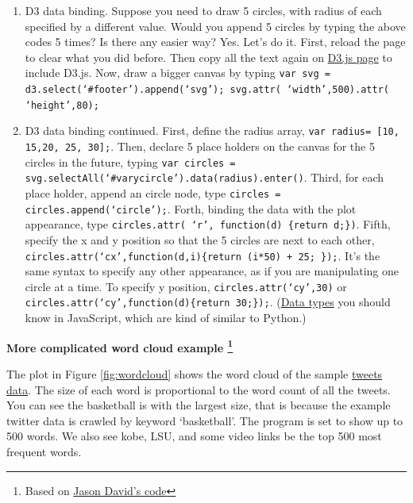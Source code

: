 \documentclass[a4paper, 11pt]{article}
\begin{document}
\begin{enumerate}
\item D3 data binding. Suppose you need to draw 5 circles, with radius of each specified by a different value. Would you append 5 circles by typing the above codes 5 times? Is there any easier way? Yes. Let's do it. First, reload the page to clear what you did before. Then copy all the text again on \href{https://raw.githubusercontent.com/mbostock/d3/master/d3.min.js}{D3.js page} to include D3.js. Now, draw a bigger canvas by typing \texttt{var svg = d3.select(`\#{footer}').append(`svg'); svg.attr( `width',500).attr( `height',80);} 
\item D3 data binding continued. First, define the radius array, \texttt{var radius= [10, 15,20, 25, 30];}. Then, declare 5 place holders on the canvas for the 5 circles in the future, typing \texttt{var circles = svg.selectAll(`\#{varycircle}').data(radius).enter()}. Third, for each place holder, append an circle node, type \texttt{circles = circles.append(`circle');}. Forth, binding the data with the plot appearance, type \texttt{circles.attr( `r', function(d) \{return d;\})}. Fifth, specify the x and y position so that the 5 circles are next to each other, \texttt{circles.attr(`cx',function(d,i)\{return (i*50) + 25; \});}. It's the same syntax to specify any other appearance, as if you are manipulating one circle at a time. To specify y position, \texttt{circles.attr(`cy',30)} or \texttt{circles.attr(`cy',function(d)\{return 30;\});}. (\href{http://alignedleft.com/tutorials/d3/data-types}{Data types} you should know in JavaScript, which are kind of similar to Python.)



\end{enumerate}
\textbf{More complicated word cloud example \protect \footnote{Based on \href{http://www.jasondavies.com/wordcloud}{Jason David's code}}}

The plot in Figure \ref{fig:wordcloud} shows the word cloud of the sample \href{http://nymph332088.github.io/CIS4340/labassignments/Lab2/twitter_data.txt}{tweets data}. The size of each word is proportional to the word count of all the tweets. You can see the basketball is with the largest size, that is because the example twitter data is crawled by keyword `basketball'. The program is set to show up to 500 words. We also see kobe, LSU, and some video links be the top 500 most frequent words. 
\end{document}
